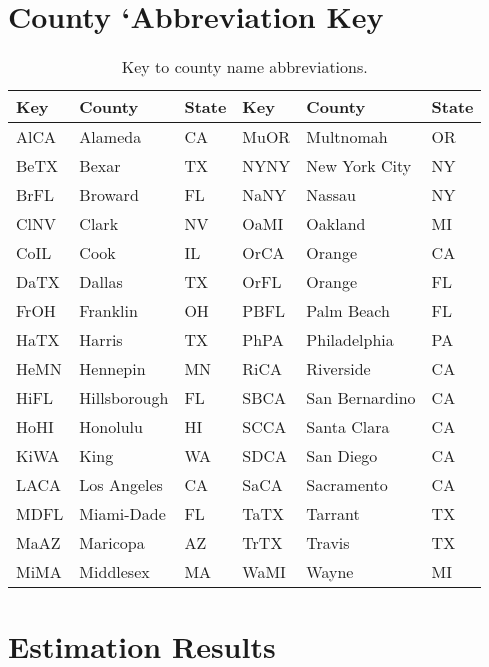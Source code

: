\documentclass[12pt,letterpaper]{article}
\begin{document}


\clearpage
\printbibliography[title=References]
\clearpage

\appendixpage
\begin{appendices}


\section{County `Abbreviation Key}

\begin{table}[!ht]
\caption{\label{tab:namekey}
Key to county name abbreviations.
}
\centering
\begin{tabular}{lll||lll}
\hline
Key&County&State&Key&County&State\\
\hline
AlCA&Alameda&CA&MuOR&Multnomah&OR\\
BeTX&Bexar&TX&NYNY&New York City&NY\\
BrFL&Broward&FL&NaNY&Nassau&NY\\
ClNV&Clark&NV&OaMI&Oakland&MI\\
CoIL&Cook&IL&OrCA&Orange&CA\\
DaTX&Dallas&TX&OrFL&Orange&FL\\
FrOH&Franklin&OH&PBFL&Palm Beach&FL\\
HaTX&Harris&TX&PhPA&Philadelphia&PA\\
HeMN&Hennepin&MN&RiCA&Riverside&CA\\
HiFL&Hillsborough&FL&SBCA&San Bernardino&CA\\
HoHI&Honolulu&HI&SCCA&Santa Clara&CA\\
KiWA&King&WA&SDCA&San Diego&CA\\
LACA&Los Angeles&CA&SaCA&Sacramento&CA\\
MDFL&Miami-Dade&FL&TaTX&Tarrant&TX\\
MaAZ&Maricopa&AZ&TrTX&Travis&TX\\
MiMA&Middlesex&MA&WaMI&Wayne&MI\\
\hline
\end{tabular}

\end{table}
\clearpage

\section{Estimation Results}


\end{appendices}
\end{document}
